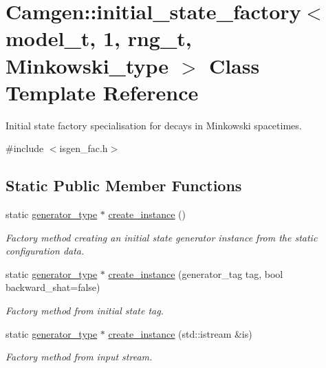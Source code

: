 \hypertarget{a00306}{\section{Camgen\-:\-:initial\-\_\-state\-\_\-factory$<$ model\-\_\-t, 1, rng\-\_\-t, Minkowski\-\_\-type $>$ Class Template Reference}
\label{a00306}
}


Initial state factory specialisation for decays in Minkowski spacetimes.  




{\ttfamily \#include $<$isgen\-\_\-fac.\-h$>$}

\subsection*{Static Public Member Functions}
\begin{DoxyCompactItemize}
\item 
static \hyperlink{a00304}{generator\-\_\-type} $\ast$ \hyperlink{a00306_ab95ba128dd8e64ff816818b8bb53f367}{create\-\_\-instance} ()
\begin{DoxyCompactList}\small\item\em Factory method creating an initial state generator instance from the static configuration data. \end{DoxyCompactList}\item 
static \hyperlink{a00304}{generator\-\_\-type} $\ast$ \hyperlink{a00306_a6cbaca64c62e564007b00cd0f7330c3d}{create\-\_\-instance} (generator\-\_\-tag tag, bool backward\-\_\-shat=false)
\begin{DoxyCompactList}\small\item\em Factory method from initial state tag. \end{DoxyCompactList}\item 
\hypertarget{a00306_aaeed0317b900a16d3c9ae310dcbe8b4c}{static \hyperlink{a00304}{generator\-\_\-type} $\ast$ \hyperlink{a00306_aaeed0317b900a16d3c9ae310dcbe8b4c}{create\-\_\-instance} (std\-::istream \&is)}\label{a00306_aaeed0317b900a16d3c9ae310dcbe8b4c}

\begin{DoxyCompactList}\small\item\em Factory method from input stream. \end{DoxyCompactList}\end{DoxyCompactItemize}


